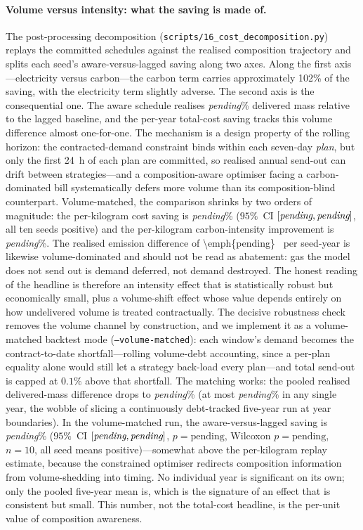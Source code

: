 \documentclass[11pt]{article}
\providecommand{\lngDecompCarbonSharePct}{102}                 %
\providecommand{\lngDecompMeanCoTwoSavingT}{\emph{pending}}
\providecommand{\lngDecompDeliveredMassDeltaPct}{\emph{pending}}
\providecommand{\lngDecompSavingPerKgPct}{\emph{pending}}
\providecommand{\lngDecompPerKgCiNineFiveLoPct}{\emph{pending}}
\providecommand{\lngDecompPerKgCiNineFiveHiPct}{\emph{pending}}
\providecommand{\lngDecompCoTwoIntensitySavingPct}{\emph{pending}}
\providecommand{\lngVolmatchSavingPct}{\emph{pending}}
\providecommand{\lngVolmatchCiNineFiveLoPct}{\emph{pending}}
\providecommand{\lngVolmatchCiNineFiveHiPct}{\emph{pending}}
\providecommand{\lngVolmatchPTwoSided}{p=\text{pending}}
\providecommand{\lngVolmatchWilcoxonPTwoSided}{p=\text{pending}}
\providecommand{\lngVolmatchSeedN}{10}
\providecommand{\lngVolmatchDeliveredMassDeltaPct}{\emph{pending}}
\providecommand{\lngVolmatchMaxAbsYearMassDeltaPct}{\emph{pending}}
\begin{document}
\paragraph{Volume versus intensity: what the saving is made of.}
The post-processing decomposition
(\texttt{scripts/16\_cost\_decomposition.py}) replays the committed schedules
against the realised composition trajectory and splits each seed's
aware-versus-lagged saving along two axes. Along the first
axis---electricity versus carbon---the carbon term carries approximately
\lngDecompCarbonSharePct\% of the saving, with the electricity term slightly
adverse. The second axis is the consequential one. The aware schedule realises
\lngDecompDeliveredMassDeltaPct\% delivered mass relative to the lagged
baseline, and the per-year total-cost saving tracks this volume difference
almost one-for-one. The mechanism is a design property of the rolling
horizon: the contracted-demand constraint binds within each seven-day
\emph{plan}, but only the first \SI{24}{\hour} of each plan are committed, so
realised annual send-out can drift between strategies---and a
composition-aware optimiser facing a carbon-dominated bill systematically
defers more volume than its composition-blind counterpart. Volume-matched,
the comparison shrinks by two orders of magnitude: the per-kilogram cost
saving is \lngDecompSavingPerKgPct\% ($95\%$~CI
$[\lngDecompPerKgCiNineFiveLoPct, \lngDecompPerKgCiNineFiveHiPct]$, all ten
seeds positive) and the per-kilogram carbon-intensity improvement is
\lngDecompCoTwoIntensitySavingPct\%. The realised emission difference of
\num{\lngDecompMeanCoTwoSavingT}~\si{\tCOtwo} per seed-year is likewise
volume-dominated and should not be read as abatement: gas the model does not
send out is demand deferred, not demand destroyed. The honest reading of the
headline is therefore an intensity effect that is statistically robust but
economically small, plus a volume-shift effect whose value depends entirely
on how undelivered volume is treated contractually. The decisive robustness
check removes the volume channel by construction, and we implement it as a
volume-matched backtest mode (\texttt{--volume-matched}): each window's
demand becomes the contract-to-date shortfall---rolling volume-debt
accounting, since a per-plan equality alone would still let a strategy
back-load every plan---and total send-out is capped at $0.1\%$ above that
shortfall. The matching works: the pooled realised delivered-mass difference
drops to \lngVolmatchDeliveredMassDeltaPct\% (at most
\lngVolmatchMaxAbsYearMassDeltaPct\% in any single year, the wobble of
slicing a continuously debt-tracked five-year run at year boundaries). In the
volume-matched run, the aware-versus-lagged saving is \lngVolmatchSavingPct\%
($95\%$~CI $[\lngVolmatchCiNineFiveLoPct, \lngVolmatchCiNineFiveHiPct]$,
$\lngVolmatchPTwoSided$, Wilcoxon $\lngVolmatchWilcoxonPTwoSided$,
$n=\lngVolmatchSeedN$, all seed means positive)---somewhat above the
per-kilogram replay estimate, because the constrained optimiser redirects
composition information from volume-shedding into timing. No individual year
is significant on its own; only the pooled five-year mean is, which is the
signature of an effect that is consistent but small. This number, not the
total-cost headline, is the per-unit value of composition awareness.
\end{document}
